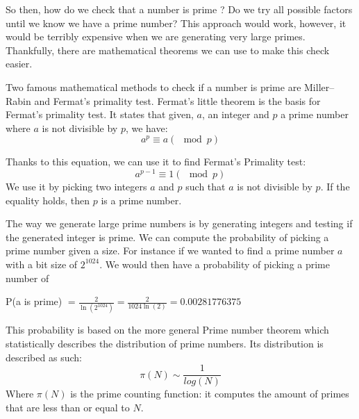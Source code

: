 \documentclass[conference]{IEEEtran}
\begin{document}
So then, how do we check that a number is prime ? Do we try all possible factors
until we know we have a prime number? This approach would work, however, it 
would be terribly expensive when we are generating very large primes.
Thankfully, there are mathematical theorems we can use to make this check easier.

Two famous mathematical methods to check if a number is prime 
are Miller–Rabin and Fermat's primality test. 
Fermat's little theorem is the basis for Fermat's primality test. It states that
given, $a$, an integer and $p$ a prime number where $a$ is not divisible by $p$, we have:
\begin{equation*}
    a^{p} \equiv a (\mod p)
\end{equation*}

Thanks to this equation, we can use it to find Fermat's Primality test: 
\begin{equation*}
    a^{p - 1} \equiv 1 (\mod p)
\end{equation*}
We use it by picking two integers $a$ and $p$ such that $a$ is not divisible by $p$.
If the equality holds, then $p$ is a prime number.

The way we generate large prime numbers is by generating integers and testing if the generated integer is
prime. We can compute the probability of picking a prime number given a size. For instance if we wanted to 
find a prime number $a$ with a bit size of $2^{1024}$. We would then have a probability of picking a prime
number of \\
\begin{center}
    P(a is prime) $= \frac{2}{\ln(2^{1024})} = \frac{2}{1024\ln(2)} = 0.00281776375$
\end{center}
This probability is based on the more general Prime number theorem which statistically describes the distribution of prime numbers.
Its distribution is described as such:
\begin{equation*}
    \pi(N) \sim \frac{1}{log(N)}
\end{equation*}
Where $\pi(N)$ is the prime counting function: it computes the amount of primes
that are less than or equal to $N$.
\end{document}
